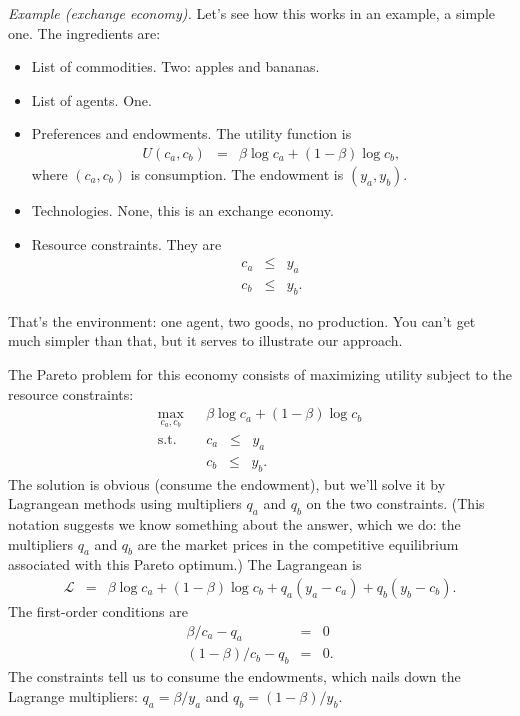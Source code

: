 \documentclass[11pt]{article}
\begin{document}
{\it Example (exchange economy).\/}
Let's see how this works in an example, a simple one.
The ingredients are:
%
\begin{itemize}
\item List of commodities.   Two:  apples and bananas.
\item List of agents.  One.
\item Preferences and endowments.  The utility function is
\begin{eqnarray*}
    U(c_a,c_b) &=& \beta \log c_a + (1-\beta) \log c_b ,
\end{eqnarray*}
where $(c_a,c_b)$ is consumption.
The endowment is $(y_a,y_b)$.
\item Technologies.  None, this is an exchange economy.
\item Resource constraints.  They are
\begin{eqnarray*}
    c_a &\leq& y_a \\
    c_b &\leq& y_b .
\end{eqnarray*}
\end{itemize}
That's the environment:  one agent, two goods, no production.
You can't get much simpler than that,
but it serves to illustrate our approach.

The Pareto problem for this economy consists of maximizing utility subject
to the resource constraints:
\begin{eqnarray*}
    \max_{c_a,c_b} &&  \beta \log c_a + (1-\beta) \log c_b \\
    \mbox{s.t.}   &&  c_a \;\;\leq\;\; y_a \\
                  &&  c_b \;\;\leq\;\; y_b .
\end{eqnarray*}
The solution is obvious (consume the endowment),
but we'll solve it by Lagrangean methods using
multipliers $q_a$ and $q_b$ on the two constraints.
(This notation suggests we know something about the answer,
which we do:  the multipliers $q_a$ and $q_b$ are the market prices
in the competitive equilibrium associated with this Pareto optimum.)
The Lagrangean is
\begin{eqnarray*}
    \mathcal{L} &=&  \beta \log c_a + (1-\beta) \log c_b
                + q_a (y_a - c_a) + q_b (y_b - c_b) .
\end{eqnarray*}
The first-order conditions are
\begin{eqnarray*}
    \beta/c_a - q_a &=& 0 \\
   (1-\beta)/c_b - q_b &=& 0 .
\end{eqnarray*}
The constraints tell us to consume the endowments,
which nails down the Lagrange multipliers:
$ q_a = \beta /y_a$ and $q_b = (1-\beta)/ y_b$.
\end{document}
